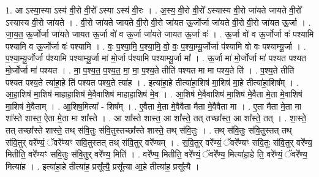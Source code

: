 \documentclass[17pt]{extarticle}
\begin{document}
1. आ ऽस्या॒स्या ऽस्य॑ वी॒रो वी॒रो᳚ ऽस्या ऽस्य॑ वी॒रः । . अ॒स्य॒ वी॒रो वी॒रो᳚ ऽस्यास्य वी॒रो जा॑यते जायते वी॒रो᳚ ऽस्यास्य वी॒रो जा॑यते । . वी॒रो जा॑यते जायते वी॒रो वी॒रो जा॑यत ऊ॒र्जोर्जा जा॑यते वी॒रो वी॒रो जा॑यत ऊ॒र्जा । . जा॒य॒त॒ ऊ॒र्जोर्जा जा॑यते जायत ऊ॒र्जा वो॑ व ऊ॒र्जा जा॑यते जायत ऊ॒र्जा वः॑ । . ऊ॒र्जा वो॑ व ऊ॒र्जोर्जा वः॑ पश्यामि पश्यामि व ऊ॒र्जोर्जा वः॑ पश्यामि । . वः॒ प॒श्या॒मि॒ प॒श्या॒मि॒ वो॒ वः॒ प॒श्या॒म्यू॒र्जोर्जा प॑श्यामि वो वः पश्याम्यू॒र्जा । . प॒श्या॒म्यू॒र्जोर्जा प॑श्यामि पश्याम्यू॒र्जा मा॑ मो॒र्जा प॑श्यामि पश्याम्यू॒र्जा मा᳚ । . ऊ॒र्जा मा॑ मो॒र्जोर्जा मा॑ पश्यत पश्यत मो॒र्जोर्जा मा॑ पश्यत । . मा॒ प॒श्य॒त॒ प॒श्य॒त॒ मा॒ मा॒ प॒श्य॒ते तीति॑ पश्यत मा मा पश्य॒ते ति॑ । . प॒श्य॒ते तीति॑ पश्यत पश्य॒ते त्या॑हा॒हे ति॑ पश्यत पश्य॒ते त्या॑ह । . इत्या॑हा॒हे तीत्या॑हा॒शिष॑ मा॒शिष॑ मा॒हे तीत्या॑हा॒शिष᳚म् । . आ॒हा॒शिष॑ मा॒शिष॑ माहाहा॒शिष॑ मे॒वैवाशिष॑ माहाहा॒शिष॑ मे॒व । . आ॒शिष॑ मे॒वैवाशिष॑ मा॒शिष॑ मे॒वैता मे॒ता मे॒वाशिष॑ मा॒शिष॑ मे॒वैताम् । . आ॒शिष॒मित्या᳚ - शिष᳚म् । . ए॒वैता मे॒ता मे॒वैवैता मैता मे॒वैवैता मा । . ए॒ता मैता मे॒ता मा शा᳚स्ते शास्त॒ ऐता मे॒ता मा शा᳚स्ते । . आ शा᳚स्ते शास्त॒ आ शा᳚स्ते॒ तत् तच्छा᳚स्त॒ आ शा᳚स्ते॒ तत् । . शा॒स्ते॒ तत् तच्छा᳚स्ते शास्ते॒ तथ् स॑वि॒तुः स॑वि॒तुस्तच्छा᳚स्ते शास्ते॒ तथ् स॑वि॒तुः । . तथ् स॑वि॒तुः स॑वि॒तुस्तत् तथ् स॑वि॒तुर् वरे᳚ण्यं॒ ॅवरे᳚ण्यꣳ सवि॒तुस्तत् तथ् स॑वि॒तुर् वरे᳚ण्यम् । . स॒वि॒तुर् वरे᳚ण्यं॒ ॅवरे᳚ण्यꣳ सवि॒तुः स॑वि॒तुर् वरे᳚ण्य॒ मितीति॒ वरे᳚ण्यꣳ सवि॒तुः स॑वि॒तुर् वरे᳚ण्य॒ मिति॑ । . वरे᳚ण्य॒ मितीति॒ वरे᳚ण्यं॒ ॅवरे᳚ण्य॒ मित्या॑हा॒हे ति॒ वरे᳚ण्यं॒ ॅवरे᳚ण्य॒ मित्या॑ह । . इत्या॑हा॒हे तीत्या॑ह॒ प्रसू᳚त्यै॒ प्रसू᳚त्या आ॒हे तीत्या॑ह॒ प्रसू᳚त्यै । \newline
\end{document}
